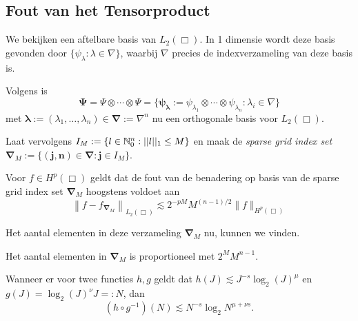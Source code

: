 \subsection{Fout van het Tensorproduct}
We bekijken een aftelbare basis van $L_2(\Box)$. In 1 dimensie wordt deze basis gevonden door $\{ \psi_\lambda: \lambda \in \nabla \}$, waarbij $\nabla$ precies de indexverzameling van deze basis is.

Volgens \cite[L3.1.7]{tammo} is 
\[ 
  \boldsymbol\Psi = \Psi \otimes \cdots \otimes \Psi = \{ \boldsymbol{\psi_\lambda} := \psi_{\lambda_1} \otimes \cdots \otimes \psi_{\lambda_n}: \lambda_i \in \nabla \}
\]
met $\boldsymbol\lambda := (\lambda_1, \ldots, \lambda_n) \in \boldsymbol{\nabla} := \nabla^n$ nu een orthogonale basis voor $L_2(\Box)$.

Laat vervolgens $I_M := \{ l \in \mathbb{N}^n_0: ||l||_1 \leq M \}$ en maak de \emph{sparse grid index set} $\boldsymbol{\nabla}_M := \{ \boldsymbol{(j,n)} \in \boldsymbol{\nabla}: \boldsymbol{j} \in I_M \}$.

\begin{lemm}{\cite[P3.2.3]{tammo}}
  Voor $f \in H^p(\Box)$ geldt dat de fout van de benadering op basis van de sparse grid index set $\boldsymbol{\nabla}_M$ hoogstens voldoet aan
  \[
  \left\| f - f_{\boldsymbol\nabla_M} \right\|_{L_2(\Box)} \lesssim 2^{-pM} M^{(n-1)/2} \| f \|_{H^p(\Box)}
  \]
\end{lemm}

Het aantal elementen in deze verzameling $\boldsymbol{\nabla}_M$ nu, kunnen we vinden.
\begin{lemm}{\cite[L3.3.1]{tammo}}
  Het aantal elementen in $\boldsymbol{\nabla}_M$ is proportioneel met $2^M M^{n-1}$.
\end{lemm}

\begin{lemm}{\cite[L3.4.1]{tammo}}
  Wanneer er voor twee functies $h, g$ geldt dat $h(J) \lesssim J^{-s}\log_2(J)^\mu$ en $g(J) = \log_2(J)^\nu J =: N$, dan
  \[
  (h \circ g^{-1})(N) \lesssim N^{-s} \log_2{N}^{\mu + \nu s}.
  \]
\end{lemm}

